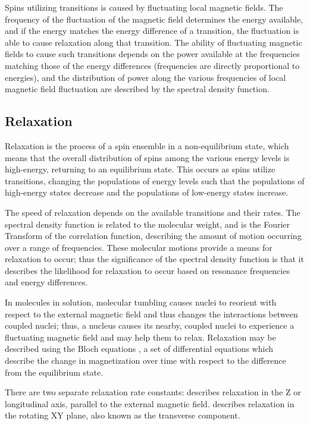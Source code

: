 Spins utilizing transitions is caused by fluctuating local magnetic fields.  
The frequency of
the fluctuation of the magnetic field determines the energy available, and if 
the energy matches the energy difference of a transition, the fluctuation is able
to cause relaxation along that transition.  The ability of fluctuating magnetic
fields to cause such transitions depends on the power available at the 
frequencies matching those of the energy differences (frequencies are directly
proportional to energies), and the distribution of power along the various
frequencies of local magnetic field fluctuation are described by the spectral
density function.


\subsection*{Relaxation}

Relaxation is the process of a spin ensemble in a non-equilibrium state, which
means that the overall distribution of spins among the various energy levels
is high-energy, returning to an equilibrium state.  This occurs as spins
utilize transitions, changing the populations of energy levels such that the
populations of high-energy states decrease and the populations of low-energy
states increase.

The speed of relaxation depends on the available transitions and their rates.
The spectral density function is related to the molecular weight,
and is the Fourier Transform of the 
correlation function, describing the amount of motion occurring over a 
range of frequencies.  These molecular motions provide a means for relaxation
to occur; thus the significance of the spectral density function is
that it describes the likelihood for relaxation to occur based on resonance
frequencies and energy differences.

In molecules in solution, molecular tumbling causes nuclei to reorient with
respect to the external magnetic field and thus changes the interactions
between coupled nuclei; thus, a nucleus causes its nearby, coupled nuclei to
experience a fluctuating magnetic field and may help them to relax.
Relaxation may be described using the Bloch equations \cite{bloch1946nuclear},
a set of differential equations which describe the change in magnetization 
over time with respect to the difference from the equilibrium state.

There are two separate relaxation rate constants: \mattftone{} describes 
relaxation in the Z or longitudinal axis, parallel to the external magnetic
field.  \mattfttwo{} describes relaxation in the rotating XY plane, also known
as the transverse component.


